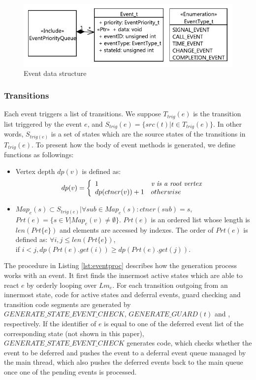 \begin{figure}
	\centering
	\includegraphics[clip, trim=0.2cm 0.2cm 0.2cm 0.2cm, width=0.6\columnwidth]{figures/eventqueue.pdf}
	\caption{Event data structure} 
	\label{fig:eventqueue}
\end{figure}

\subsubsection{Transitions}

Each event triggers a list of transitions. We suppose $T_{trig}(e)$ is the transition list triggered by the event $e$, and $S_{trig}(e) = \{src(t) | t \in T_{trig}(e)\}$. In other words, $S_{trig(e)}$ is a set of states which are the source states of the transitions in $T_{trig}(e)$. To present how the body of event methods is generated, we define functions as followings:
\begin{itemize}
	\item Vertex depth $dp(v)$ is defined as:
			\begin{equation}
			dp(v) =    \left\{
			\begin{array}{ll}
			1 & \textit{v is a root vertex}  \\
			dp(ctner(v)) + 1& otherwise \\
			\end{array} 
			\right.
			\end{equation}
	\item $Map_{e}(s) \subset S_{trig(e)} | \forall sub \in Map_e(s): ctner(sub) = s$, $Prt(e) = \{s \in V| Map_{e}(v) \neq \emptyset\}$. $Prt(e)$ is an ordered list whose length is $len(Prt\{e\})$ and elements are accessed by indexes. The order of $Prt(e)$ is defined as:	$\forall i, j \leq len(Prt\{e\})$, 
	\\ if $i < j, dp(Prt(e).get(i)) \geq dp(Prt(e).get(j))$. 	
\end{itemize}

The procedure in Listing \ref{lst:eventproc} describes how the generation process works with an event. 
It first finds the innermost active states which are able to react $e$ by orderly looping over $Lm_e$. 
For each transition outgoing from an innermost state, code for active states and deferral events, guard checking and transition code segments are generated by $GENERATE\_STATE\_EVENT\_CHECK$, $GENERATE\_GUARD(t)$ and , respectively. 
If the identifier of $e$ is equal to one of the deferred event list of the corresponding state (not shown in this paper), $GENERATE\_STATE\_EVENT\_CHECK$ generates code, which checks whether the event to be deferred and pushes the event to a deferral event queue managed by the main thread, which also pushes the deferred events back to the main queue once one of the pending events is processed. 

